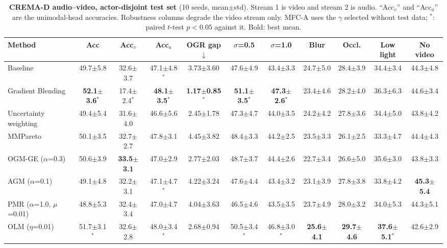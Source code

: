 \documentclass[fleqn,10pt]{wlscirep}
\newcommand{\pmm}{$\pm$}
\begin{document}
\begin{table}[t]
\caption{\textbf{CREMA-D audio--video, actor-disjoint test set} (10 seeds, mean\pmm std). Stream 1 is video and stream 2 is audio. ``Acc$_v$'' and ``Acc$_a$'' are the unimodal-head accuracies. Robustness columns degrade the video stream only. MFC-A uses the $\gamma$ selected without test data; $^{*}$: paired $t$-test $p<0.05$ against it. Bold: best mean.}
\label{tab:main_av}
\centering
\footnotesize
\setlength{\tabcolsep}{3pt}
\begin{tabular}{@{}lcccccccccc@{}}
\toprule
\textbf{Method} & \textbf{Acc} & \textbf{Acc$_v$} & \textbf{Acc$_a$} & \textbf{OGR gap}$\downarrow$ & \textbf{$\sigma$=0.5} & \textbf{$\sigma$=1.0} & \textbf{Blur} & \textbf{Occl.} & \textbf{Low light} & \textbf{No video} \\ \midrule
Baseline & 49.7$\pm$5.8 & 32.6$\pm$3.7 & 47.1$\pm$4.8$^{*}$ & 3.73$\pm$3.60 & 47.6$\pm$4.9 & 43.4$\pm$3.3 & 24.7$\pm$5.0 & 28.4$\pm$3.9 & 34.4$\pm$3.4 & 44.3$\pm$4.8 \\
Gradient Blending & \textbf{52.1$\pm$3.6$^{*}$} & 17.4$\pm$2.4$^{*}$ & \textbf{48.1$\pm$3.5$^{*}$} & \textbf{1.17$\pm$0.85$^{*}$} & \textbf{51.1$\pm$3.5$^{*}$} & \textbf{47.3$\pm$2.6$^{*}$} & 23.4$\pm$4.6 & 28.2$\pm$4.0 & 36.3$\pm$6.3 & 44.6$\pm$3.4 \\
Uncertainty weighting & 49.4$\pm$5.4 & 31.6$\pm$4.0 & 46.6$\pm$5.6 & 2.45$\pm$1.78 & 47.3$\pm$4.7 & 44.0$\pm$3.5 & 24.2$\pm$4.2 & 27.8$\pm$3.6 & 34.4$\pm$5.0 & 43.8$\pm$4.2 \\
MMPareto & 50.1$\pm$3.5 & 32.7$\pm$2.7 & 47.8$\pm$3.1 & 4.45$\pm$3.82 & 48.4$\pm$3.3 & 44.2$\pm$2.5 & 23.5$\pm$3.3 & 26.1$\pm$2.5 & 33.3$\pm$4.7 & 44.4$\pm$4.3 \\
OGM-GE ($\alpha$=0.3) & 50.6$\pm$3.9 & \textbf{33.5$\pm$3.1} & 47.0$\pm$2.9 & 2.77$\pm$2.03 & 48.7$\pm$3.7 & 44.4$\pm$2.6 & 22.7$\pm$3.4 & 26.6$\pm$5.0 & 35.6$\pm$3.0 & 43.8$\pm$3.3 \\
AGM ($\alpha$=0.1) & 49.1$\pm$4.8 & 32.2$\pm$3.1 & 47.1$\pm$4.7$^{*}$ & 4.22$\pm$3.24 & 47.6$\pm$4.4 & 43.4$\pm$3.2 & 23.1$\pm$3.9 & 27.8$\pm$3.8 & 33.8$\pm$4.2 & \textbf{45.3$\pm$5.4} \\
PMR ($\alpha$=1.0, $\mu$=0.01) & 48.8$\pm$5.3 & 32.4$\pm$3.4 & 47.0$\pm$4.7 & 4.04$\pm$3.63 & 46.5$\pm$4.6 & 43.5$\pm$3.5 & 23.7$\pm$4.9 & 28.0$\pm$3.2 & 34.0$\pm$5.3 & 44.3$\pm$5.1 \\
OLM ($\eta$=0.01) & 51.7$\pm$3.1$^{*}$ & 32.6$\pm$2.8 & 48.0$\pm$3.4$^{*}$ & 2.68$\pm$0.94 & 50.5$\pm$3.4$^{*}$ & 46.8$\pm$3.0$^{*}$ & \textbf{25.6$\pm$4.1} & \textbf{29.7$\pm$4.6} & \textbf{37.6$\pm$5.1$^{*}$} & 42.6$\pm$2.9 \\

\end{tabular}
\end{table}
\end{document}
